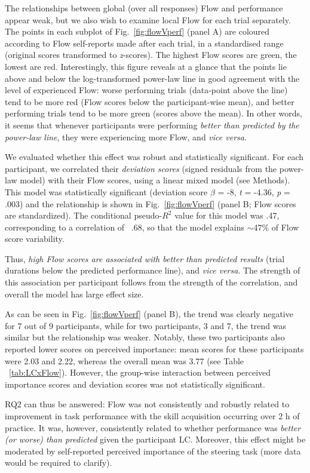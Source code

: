 The relationships between global (over all responses) Flow and performance appear weak, but we also wish to examine local Flow for each trial separately. The points in each subplot of Fig.~\ref{fig:flowVperf} (panel A) are coloured according to Flow self-reports made after each trial, in a standardised range (original scores transformed to {\it z}-scores). The highest Flow scores are green, the lowest are red. Interestingly, this figure reveals at a glance that the points lie above and below the log-transformed power-law line in good agreement with the level of experienced Flow: worse performing trials (data-point above the line) tend to be more red (Flow scores below the participant-wise mean), and better performing trials tend to be more green (scores above the mean). In other words, it seems that whenever participants were performing {\it better than predicted by the power-law line}, they were experiencing more Flow, and {\it vice versa}.

We evaluated whether this effect was robust and statistically significant. For each participant, we correlated their {\it deviation scores} (signed residuals from the power-law model) with their Flow scores, using a linear mixed model (see Methods). This model was statistically significant (deviation score $\beta$ = -8, {\it t} = -4.36, {\it p} = .003) %
and the relationship is shown in Fig.~\ref{fig:flowVperf} (panel B; Flow scores are standardized). The conditional pseudo-$R^2$ value for this model was .47, corresponding to a correlation of ~.68, so that the model explains $\sim$47\% of Flow score variability.

Thus, {\it high Flow scores are associated with better than predicted results} (trial durations below the predicted performance line), and {\it vice versa}. The strength of this association per participant follows from the strength of the correlation, and overall the model has large effect size.

As can be seen in Fig.~\ref{fig:flowVperf} (panel B), the trend was clearly negative for 7 out of 9 participants, while for two participants, 3 and 7, the trend was similar but the relationship was weaker. Notably, these two participants also reported lower scores on perceived importance: mean scores for these participants were 2.03 and 2.22, whereas the overall mean was 3.77 (see Table ~\ref{tab:LCxFlow}). However, the group-wise interaction between perceived importance scores and deviation scores was not statistically significant.

RQ2 can thus be answered: Flow was not consistently and robustly related to improvement in task performance with the skill acquisition occurring over 2 h of practice. It was, however, consistently related to whether performance was {\it better (or worse) than predicted} given the participant LC. Moreover, this effect might be moderated by self-reported perceived importance of the steering task (more data would be required to clarify).

